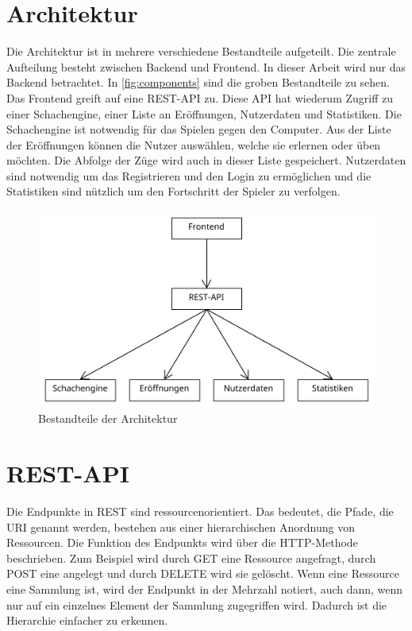 \section{Architektur}
Die Architektur ist in mehrere verschiedene Bestandteile aufgeteilt. Die zentrale Aufteilung besteht zwischen Backend und Frontend. In dieser Arbeit wird nur das Backend betrachtet. In \autoref{fig:components} sind die groben Bestandteile zu sehen. Das Frontend greift auf eine \ac{REST}-API zu. Diese API hat wiederum Zugriff zu einer Schachengine, einer Liste an Eröffnungen, Nutzerdaten und Statistiken. Die Schachengine ist notwendig für das Spielen gegen den Computer. Aus der Liste der Eröffnungen können die Nutzer auswählen, welche sie erlernen oder üben möchten. Die Abfolge der Züge wird auch in dieser Liste gespeichert. Nutzerdaten sind notwendig um das Registrieren und den Login zu ermöglichen und die Statistiken sind nützlich um den Fortschritt der Spieler zu verfolgen.

\begin{figure}[h]
    \includegraphics{images/diagrams/components.pdf}
    \caption{Bestandteile der Architektur}
    \label{fig:components}
\end{figure}

\section{REST-API}
Die Endpunkte in \ac{REST} sind ressourcenorientiert. Das bedeutet, die Pfade, die \ac{URI} genannt werden, bestehen aus einer hierarchischen Anordnung von Ressourcen. Die Funktion des Endpunkts wird über die HTTP-Methode beschrieben. Zum Beispiel wird durch GET eine Ressource angefragt, durch POST eine angelegt und durch DELETE wird sie gelöscht. Wenn eine Ressource eine Sammlung ist, wird der Endpunkt in der Mehrzahl notiert, auch dann, wenn nur auf ein einzelnes Element der Sammlung zugegriffen wird. Dadurch ist die Hierarchie einfacher zu erkennen.

